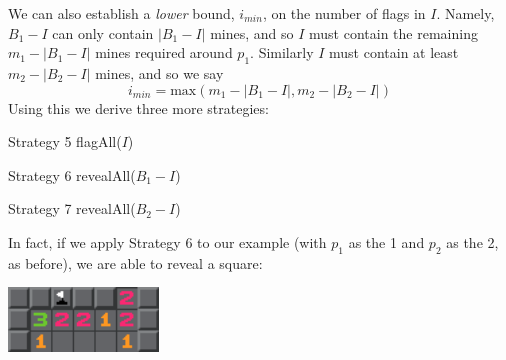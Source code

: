 \documentclass{article}
\theoremstyle{definition}
\theoremstyle{definition}
\theoremstyle{theorem}
\begin{document}
	We can also establish a \textit{lower} bound, $i_{min}$, on the number of flags in $I$. Namely, $B_1 - I$ can only contain $|B_1 - I|$ mines, and so $I$ must contain the remaining $m_1 - |B_1 - I|$ mines required around $p_1$. Similarly $I$ must contain at least $m_2 - |B_2 - I|$ mines, and so we say
	$$i_{min} = \textrm{max}(m_1 - |B_1 - I|, m_2 - |B_2 - I|)$$
	Using this we derive three more strategies:
	\begin{algorithmic}
		 \Comment Strategy 5
		\State flagAll($I$)
		\EndIf
	\end{algorithmic}
	\begin{algorithmic}
		 \Comment Strategy 6
		\State revealAll($B_1 - I$)
		\EndIf
	\end{algorithmic}
	\begin{algorithmic}
		 \Comment Strategy 7
		\State revealAll($B_2 - I$)
		\EndIf
	\end{algorithmic}
	In fact, if we apply Strategy 6 to our example (with $p_1$ as the 1 and $p_2$ as the 2, as before), we are able to reveal a square:
	\begin{center}
		\includegraphics[width=0.3\textwidth]{exampleimages/example2c}
	\end{center}
	
\end{document}
